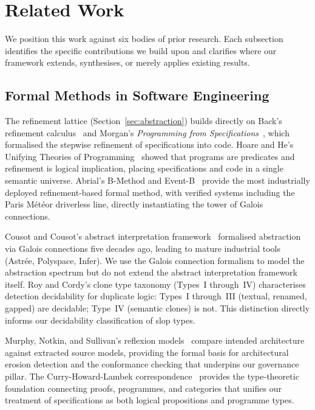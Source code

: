 \documentclass[11pt, a4paper, logo, copyright]{googledeepmind}
\begin{document}
\section{Related Work}
\label{sec:related}

We position this work against six bodies of prior research.  Each subsection
identifies the specific contributions we build upon and clarifies where our
framework extends, synthesises, or merely applies existing results.


\subsection{Formal Methods in Software Engineering}

The refinement lattice (Section~\ref{sec:abstraction}) builds directly on Back's
refinement calculus~\citep{back1980correctness} and Morgan's \emph{Programming
from Specifications}~\citep{morgan1994programming}, which formalised the
stepwise refinement of specifications into code.  Hoare and He's Unifying
Theories of Programming~\citep{hoare1998unifying} showed that programs are
predicates and refinement is logical implication, placing specifications and
code in a single semantic universe.  Abrial's B-Method and
Event-B~\citep{abrial2010modeling} provide the most industrially deployed
refinement-based formal method, with verified systems including the Paris
M\'{e}t\'{e}or driverless line, directly instantiating the tower of Galois
connections.

Cousot and Cousot's abstract interpretation
framework~\citep{cousot1977abstract} formalised abstraction via Galois
connections five decades ago, leading to mature industrial tools (Astr\'{e}e,
Polyspace, Infer).  We use the Galois connection formalism to model the
abstraction spectrum but do not extend the abstract interpretation framework
itself.  Roy and Cordy's clone type taxonomy (Types~I through~IV) characterises
detection decidability for duplicate logic: Types~I through~III (textual,
renamed, gapped) are decidable; Type~IV (semantic clones) is not.  This
distinction directly informs our decidability classification of slop types.

Murphy, Notkin, and Sullivan's reflexion models~\citep{murphy1995, murphy2001}
compare intended architecture against extracted source models, providing the
formal basis for architectural erosion detection and the conformance checking
that underpins our governance pillar.  The Curry-Howard-Lambek
correspondence~\citep{wadler2015propositions} provides the type-theoretic
foundation connecting proofs, programmes, and categories that unifies our
treatment of specifications as both logical propositions and programme types.
\end{document}
